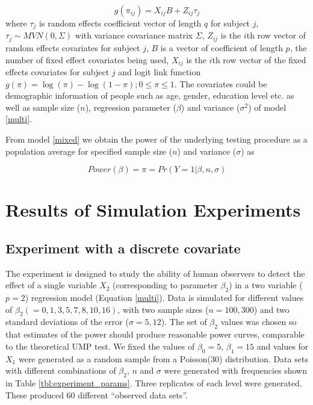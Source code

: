 \documentclass{article}
\begin{document}
\begin{equation}
g(\pi_{ij}) = X_{ij}B  + Z_{ij} \tau_j 
\label{mixed} 
\end{equation}
%
where $\tau_j$ is random effects coefficient vector of length $q$ for subject $j$,  $\tau_j  \sim  MVN(0,\Sigma)$ with variance covariance matrix $\Sigma$, $Z_{ij}$ is the $i$th row vector of random effects covariates for subject $j$, $B$ is a vector of coefficient of length $p$, the number of fixed effect covariates being used, $X_{ij}$ is the $i$th row vector of the fixed effects covariates for subject $j$ and logit link function $g(\pi)=\log(\pi) - \log(1-\pi); 0 \le \pi \le 1$. The covariates could be demographic information of people such as age, gender, education level etc. as well as sample size ($n$), regression parameter ($\beta$) and variance ($\sigma^2$) of model \ref{multi}. 

From model \ref{mixed} we obtain %
the power of the underlying testing procedure as a population average %
for specified sample size ($n$) and  variance ($\sigma$)  as 

\begin{equation}\label{eqn:power} 
Power(\beta) = \pi=Pr(Y=1|\beta, n, \sigma) 
\end{equation}


\section{Results of Simulation Experiments} \label{sec:simulation}

\subsection{Experiment with a discrete covariate}

The experiment is designed to study the ability of human observers to detect the effect of a single variable $X_2$ (corresponding to parameter $\beta_2$) in a two variable ($p=2$) regression model (Equation \eqref{multi}). Data is simulated for different values of $\beta_2 (=0, 1, 3, 5, 7, 8, 10, 16)$, with two sample sizes ($n=100, 300$) and two standard deviations of the error ($\sigma=5, 12$). The set of $\beta_2$ values was chosen so that estimates of the power should produce reasonable power curves, comparable to the theoretical UMP test. We fixed the values of $\beta_0 = 5$,  $\beta_1=15$ and values for $X_1$ were generated as a random sample from a Poisson(30) distribution. Data sets with different combinations of $\beta_2$,  $n$ and $\sigma$ were generated with frequencies shown in Table \ref{tbl:experiment_params}. Three replicates of each level were generated. These produced 60 different ``observed data sets''. 
\end{document}
